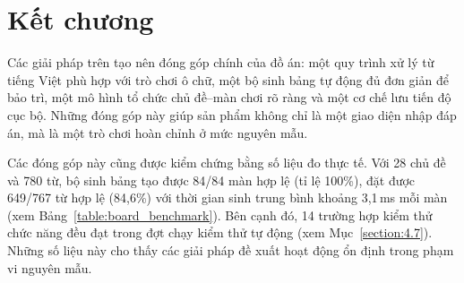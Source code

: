 \documentclass[../DoAn.tex]{subfiles}
\begin{document}
\section{Kết chương}
Các giải pháp trên tạo nên đóng góp chính của đồ án: một quy trình xử lý từ tiếng Việt phù hợp với trò chơi ô chữ, một bộ sinh bảng tự động đủ đơn giản để bảo trì, một mô hình tổ chức chủ đề--màn chơi rõ ràng và một cơ chế lưu tiến độ cục bộ. Những đóng góp này giúp sản phẩm không chỉ là một giao diện nhập đáp án, mà là một trò chơi hoàn chỉnh ở mức nguyên mẫu.

Các đóng góp này cũng được kiểm chứng bằng số liệu đo thực tế. Với 28 chủ đề và 780 từ, bộ sinh bảng tạo được 84/84 màn hợp lệ (tỉ lệ 100\%), đặt được 649/767 từ hợp lệ (84,6\%) với thời gian sinh trung bình khoảng 3,1\,ms mỗi màn (xem Bảng~\ref{table:board_benchmark}). Bên cạnh đó, 14 trường hợp kiểm thử chức năng đều đạt trong đợt chạy kiểm thử tự động (xem Mục~\ref{section:4.7}). Những số liệu này cho thấy các giải pháp đề xuất hoạt động ổn định trong phạm vi nguyên mẫu.
\end{document}
